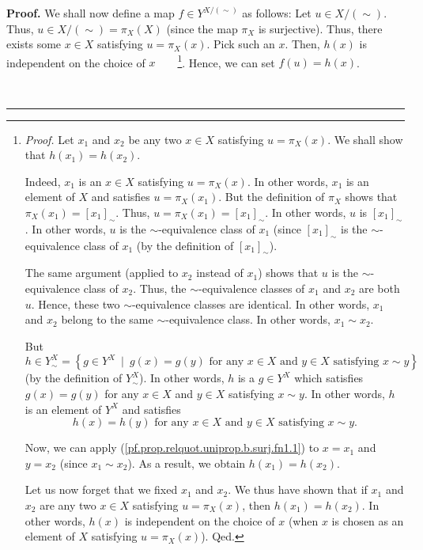 \documentclass[numbers=enddot,12pt,final,onecolumn,notitlepage]{scrartcl}%
\theoremstyle{definition}
\newenvironment{proof}[1][Proof]{\noindent\textbf{#1.} }{\ \rule{0.5em}{0.5em}}
\newenvironment{verlong}{}{}
\begin{document}
\begin{verlong}
\begin{proof}
We shall now define a map $f\in Y^{X/\left(  \sim\right)  }$ as follows: Let
$u\in X/\left(  \sim\right)  $. Thus, $u\in X/\left(  \sim\right)  =\pi
_{X}\left(  X\right)  $ (since the map $\pi_{X}$ is surjective). Thus, there
exists some $x\in X$ satisfying $u=\pi_{X}\left(  x\right)  $. Pick such an
$x$. Then, $h\left(  x\right)  $ is independent on the choice of
$x$\ \ \ \ \footnote{\textit{Proof.} Let $x_{1}$ and $x_{2}$ be any two $x\in
X$ satisfying $u=\pi_{X}\left(  x\right)  $. We shall show that $h\left(
x_{1}\right)  =h\left(  x_{2}\right)  $.
\par
Indeed, $x_{1}$ is an $x\in X$ satisfying $u=\pi_{X}\left(  x\right)  $. In
other words, $x_{1}$ is an element of $X$ and satisfies $u=\pi_{X}\left(
x_{1}\right)  $. But the definition of $\pi_{X}$ shows that $\pi_{X}\left(
x_{1}\right)  =\left[  x_{1}\right]  _{\sim}$. Thus, $u=\pi_{X}\left(
x_{1}\right)  =\left[  x_{1}\right]  _{\sim}$. In other words, $u$ is $\left[
x_{1}\right]  _{\sim}$. In other words, $u$ is the $\sim$-equivalence class of
$x_{1}$ (since $\left[  x_{1}\right]  _{\sim}$ is the $\sim$-equivalence class
of $x_{1}$ (by the definition of $\left[  x_{1}\right]  _{\sim}$).
\par
The same argument (applied to $x_{2}$ instead of $x_{1}$) shows that $u$ is
the $\sim$-equivalence class of $x_{2}$. Thus, the $\sim$-equivalence classes
of $x_{1}$ and $x_{2}$ are both $u$. Hence, these two $\sim$-equivalence
classes are identical. In other words, $x_{1}$ and $x_{2}$ belong to the same
$\sim$-equivalence class. In other words, $x_{1}\sim x_{2}$.
\par
But%
\[
h\in Y_{\sim}^{X}=\left\{  g\in Y^{X}\ \mid\ g\left(  x\right)  =g\left(
y\right)  \text{ for any }x\in X\text{ and }y\in X\text{ satisfying }x\sim
y\right\}
\]
(by the definition of $Y_{\sim}^{X}$). In other words, $h$ is a $g\in Y^{X}$
which satisfies $g\left(  x\right)  =g\left(  y\right)  $ for any $x\in X$ and
$y\in X$ satisfying $x\sim y$. In other words, $h$ is an element of $Y^{X}$
and satisfies%
\begin{equation}
h\left(  x\right)  =h\left(  y\right)  \text{ for any }x\in X\text{ and }y\in
X\text{ satisfying }x\sim y. \label{pf.prop.relquot.uniprop.b.surj.fn1.1}%
\end{equation}
\par
Now, we can apply (\ref{pf.prop.relquot.uniprop.b.surj.fn1.1}) to $x=x_{1}$
and $y=x_{2}$ (since $x_{1}\sim x_{2}$). As a result, we obtain $h\left(
x_{1}\right)  =h\left(  x_{2}\right)  $.
\par
Let us now forget that we fixed $x_{1}$ and $x_{2}$. We thus have shown that
if $x_{1}$ and $x_{2}$ are any two $x\in X$ satisfying $u=\pi_{X}\left(
x\right)  $, then $h\left(  x_{1}\right)  =h\left(  x_{2}\right)  $. In other
words, $h\left(  x\right)  $ is independent on the choice of $x$ (when $x$ is
chosen as an element of $X$ satisfying $u=\pi_{X}\left(  x\right)  $). Qed.}.
Hence, we can set $f\left(  u\right)  =h\left(  x\right)  $.


\end{proof}
\end{verlong}
\end{document}

